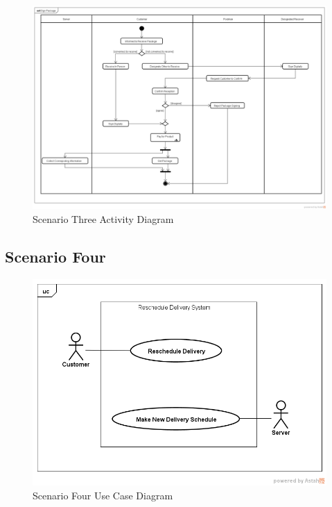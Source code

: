 \documentclass[12pt]{scrreprt}
\begin{document}
\begin{figure}[H]
  \centering\includegraphics[width=6in]{DocumentRes/3SignPackage.png}
  \caption{Scenario Three Activity Diagram}
\end{figure}

\subsection{Scenario Four}
\begin{figure}[H]
  \centering\includegraphics[width=5in]{DocumentRes/4UseCaseDiagram.png}
  \caption{Scenario Four Use Case Diagram}
\end{figure}
\end{document}
